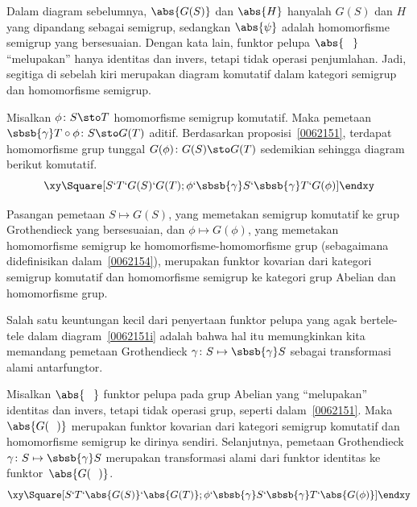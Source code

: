 Dalam diagram sebelumnya, $\abs{G(S)}$ dan $\abs{H}$ hanyalah $G(S)$ dan $H$ yang dipandang sebagai
semigrup, sedangkan $\abs{\psi}$ adalah homomorfisme semigrup yang bersesuaian. Dengan kata lain,
funktor pelupa $\abs{\hphantom{G}}$ ``melupakan'' hanya identitas dan invers, tetapi tidak
operasi penjumlahan. Jadi, segitiga di sebelah kiri merupakan diagram komutatif dalam
kategori semigrup dan homomorfisme semigrup.

\begin{prop}\label{0062154} Misalkan $\phi\colon S \sto T$ homomorfisme semigrup
komutatif. Maka pemetaan $\sbsb{\gamma}T \circ \phi\colon S \sto G(T)$ aditif. Berdasarkan
proposisi~\ref{0062151}, terdapat homomorfisme grup tunggal $G(\phi)\colon G(S)
\sto G(T)$ sedemikian sehingga diagram berikut komutatif.
   \[ \xy
          \Square[S`T`G(S)`G(T);\phi`\sbsb{\gamma}S`\sbsb{\gamma}T`G(\phi)]
      \endxy \]
\end{prop}

\begin{prop}\label{0062155} Pasangan pemetaan $S \mapsto G(S)$, yang memetakan semigrup komutatif ke
grup Grothendieck yang bersesuaian, dan $\phi \mapsto G(\phi)$, yang memetakan homomorfisme semigrup ke
homomorfisme-homomorfisme grup (sebagaimana didefinisikan dalam~\ref{0062154}), merupakan funktor kovarian dari kategori %
semigrup komutatif dan homomorfisme semigrup ke kategori grup Abelian
dan homomorfisme grup.
\end{prop}

Salah satu keuntungan kecil dari penyertaan funktor pelupa yang agak bertele-tele dalam
diagram~\eqref{0062151i} adalah bahwa hal itu memungkinkan kita memandang pemetaan Grothendieck
$\gamma\colon S \mapsto \sbsb{\gamma}S$ sebagai transformasi alami antarfungtor.

\begin{cor}\label{0062157} Misalkan $\abs{\hphantom{G}}$ funktor pelupa
pada grup Abelian yang ``melupakan'' identitas dan invers, tetapi tidak
operasi grup, seperti dalam~\ref{0062151}. Maka $\abs{G(\hphantom{S})}$ merupakan funktor kovarian dari
kategori semigrup komutatif dan homomorfisme semigrup ke dirinya sendiri.
Selanjutnya, pemetaan Grothendieck $\gamma\colon S \mapsto \sbsb{\gamma}S$ merupakan transformasi
alami dari funktor identitas ke funktor~$\abs{G(\hphantom{S})}$.
  \[ \xy
          \Square[S`T`\abs{G(S)}`\abs{G(T)};\phi`\sbsb{\gamma}S`\sbsb{\gamma}T`\abs{G(\phi)}]
      \endxy \]
\end{cor}
